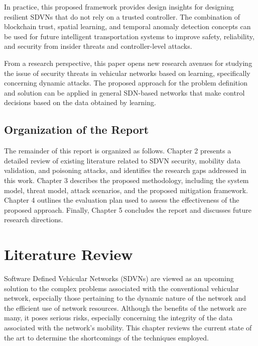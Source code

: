 \documentclass[12pt, a4paper]{report}
\begin{document}
In practice, this proposed framework provides design insights for designing resilient SDVNs that do not rely on a trusted controller. The combination of blockchain trust, spatial learning, and temporal anomaly detection concepts can be used for future intelligent transportation systems to improve safety, reliability, and security from insider threats and controller-level attacks.

From a research perspective, this paper opens new research avenues for studying the issue of security threats in vehicular networks based on learning, specifically concerning dynamic attacks. The proposed approach for the problem definition and solution can be applied in general SDN-based networks that make control decisions based on the data obtained by learning.

\section{Organization of the Report}

The remainder of this report is organized as follows. Chapter 2 presents a detailed review of existing literature related to SDVN security, mobility data validation, and poisoning attacks, and identifies the research gaps addressed in this work. Chapter 3 describes the proposed methodology, including the system model, threat model, attack scenarios, and the proposed mitigation framework. Chapter 4 outlines the evaluation plan used to assess the effectiveness of the proposed approach. Finally, Chapter 5 concludes the report and discusses future research directions.


\chapter{Literature Review}
\label{chap:litreview}

Software Defined Vehicular Networks (SDVNs) are viewed as an upcoming solution to the complex problems associated with the conventional vehicular network, especially those pertaining to the dynamic nature of the network and the efficient use of network resources. Although the benefits of the network are many, it poses serious risks, especially concerning the integrity of the data associated with the network's mobility. This chapter reviews the current state of the art to determine the shortcomings of the techniques employed.
\end{document}
